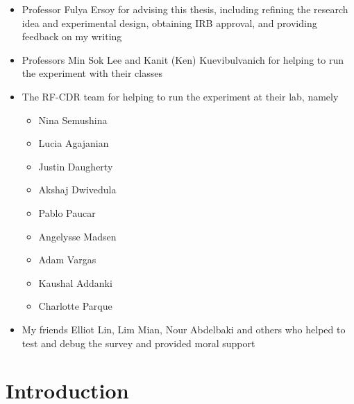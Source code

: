 \documentclass[
  12,
  letterpaper,
  DIV=11,
  numbers=noendperiod]{scrartcl}
\providecommand{\tightlist}{%
  \setlength{\itemsep}{0pt}\setlength{\parskip}{0pt}}
\begin{document}
\begin{itemize}
\tightlist
\item
  Professor Fulya Ersoy for advising this thesis, including refining the
  research idea and experimental design, obtaining IRB approval, and
  providing feedback on my writing
\item
  Professors Min Sok Lee and Kanit (Ken) Kuevibulvanich for helping to
  run the experiment with their classes
\item
  The RF-CDR team for helping to run the experiment at their lab, namely

  \begin{itemize}
  \tightlist
  \item
    Nina Semushina
  \item
    Lucia Agajanian
  \item
    Justin Daugherty
  \item
    Akshaj Dwivedula
  \item
    Pablo Paucar
  \item
    Angelysse Madsen
  \item
    Adam Vargas
  \item
    Kaushal Addanki
  \item
    Charlotte Parque
  \end{itemize}
\item
  My friends Elliot Lin, Lim Mian, Nour Abdelbaki and others who helped
  to test and debug the survey and provided moral support
\end{itemize}

\newpage

\section{Introduction}\label{introduction}
\end{document}
